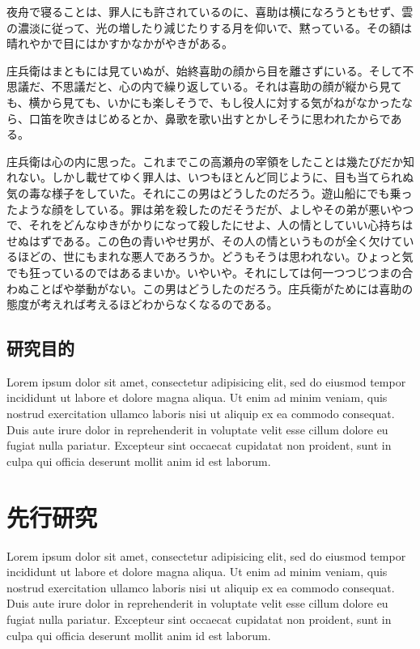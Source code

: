 \documentclass[12pt,a4j]{jreport}
\begin{document}
夜舟で寝ることは、罪人にも許されているのに、喜助は横になろうともせず、雲の濃淡に従って、光の増したり減じたりする月を仰いで、黙っている。その額は晴れやかで目にはかすかなかがやきがある。

庄兵衛はまともには見ていぬが、始終喜助の顔から目を離さずにいる。そして不思議だ、不思議だと、心の内で繰り返している。それは喜助の顔が縦から見ても、横から見ても、いかにも楽しそうで、もし役人に対する気がねがなかったなら、口笛を吹きはじめるとか、鼻歌を歌い出すとかしそうに思われたからである。

庄兵衛は心の内に思った。これまでこの高瀬舟の宰領をしたことは幾たびだか知れない。しかし載せてゆく罪人は、いつもほとんど同じように、目も当てられぬ気の毒な様子をしていた。それにこの男はどうしたのだろう。遊山船にでも乗ったような顔をしている。罪は弟を殺したのだそうだが、よしやその弟が悪いやつで、それをどんなゆきがかりになって殺したにせよ、人の情としていい心持ちはせぬはずである。この色の青いやせ男が、その人の情というものが全く欠けているほどの、世にもまれな悪人であろうか。どうもそうは思われない。ひょっと気でも狂っているのではあるまいか。いやいや。それにしては何一つつじつまの合わぬことばや挙動がない。この男はどうしたのだろう。庄兵衛がためには喜助の態度が考えれば考えるほどわからなくなるのである。

\section{研究目的}

Lorem ipsum dolor sit amet, consectetur adipisicing elit, sed do eiusmod tempor incididunt ut labore et dolore magna aliqua. Ut enim ad minim veniam, quis nostrud exercitation ullamco laboris nisi ut aliquip ex ea commodo consequat. Duis aute irure dolor in reprehenderit in voluptate velit esse cillum dolore eu fugiat nulla pariatur. Excepteur sint occaecat cupidatat non proident, sunt in culpa qui officia deserunt mollit anim id est laborum.

\chapter{先行研究}
Lorem ipsum dolor sit amet, consectetur adipisicing elit, sed do eiusmod tempor incididunt ut labore et dolore magna aliqua. Ut enim ad minim veniam, quis nostrud exercitation ullamco laboris nisi ut aliquip ex ea commodo consequat. Duis aute irure dolor in reprehenderit in voluptate velit esse cillum dolore eu fugiat nulla pariatur. Excepteur sint occaecat cupidatat non proident, sunt in culpa qui officia deserunt mollit anim id est laborum.
\end{document}
